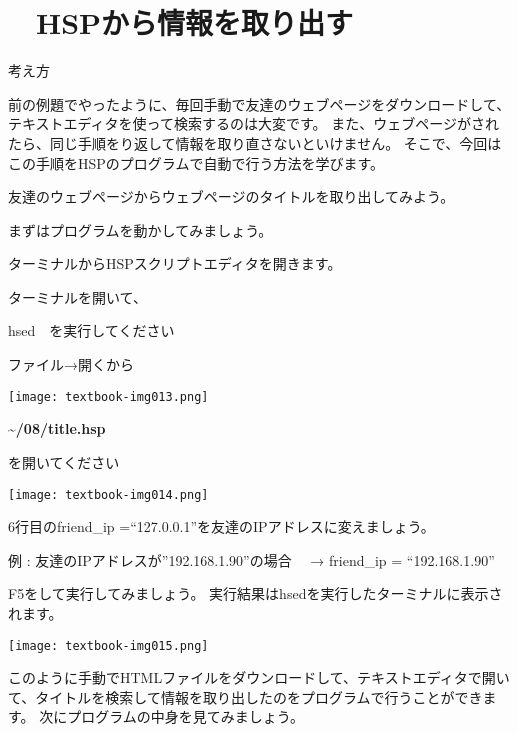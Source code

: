 \clearpage
\section{\theExercise　HSPから情報を取り出す}
\addtocounter{Exercise}{-1}\label{E:SCRAPING}
\noindent 考え方

前の例題でやったように、毎回手動で友達のウェブページをダウンロードして、テキストエディタを使って検索するのは大変です。
また、ウェブページがされたら、同じ手順をり返して情報を取り直さないといけません。
そこで、今回はこの手順をHSPのプログラムで自動で行う方法を学びます。

友達のウェブページからウェブページのタイトルを取り出してみよう。

まずはプログラムを動かしてみましょう。

ターミナルからHSPスクリプトエディタを開きます。

ターミナルを開いて、

hsed　を実行してください

ファイル→開くから

\begin{center}
  \texttt{[image: textbook-img013.png]}
\end{center}
\textbf{{\textasciitilde}/08/title.hsp}

を開いてください



\begin{center}
  \texttt{[image: textbook-img014.png]}
\end{center}

\clearpage
6行目のfriend\_ip =“127.0.0.1”を友達のIPアドレスに変えましょう。


例 : 友達のIPアドレスが”192.168.1.90”の場合
\ \ → friend\_ip = “192.168.1.90”

F5をして実行してみましょう。
実行結果はhsedを実行したターミナルに表示されます。

\begin{center}
  \texttt{[image: textbook-img015.png]}
\end{center}

このように手動でHTMLファイルをダウンロードして、テキストエディタで開いて、タイトルを検索して情報を取り出したのをプログラムで行うことができます。
次にプログラムの中身を見てみましょう。

